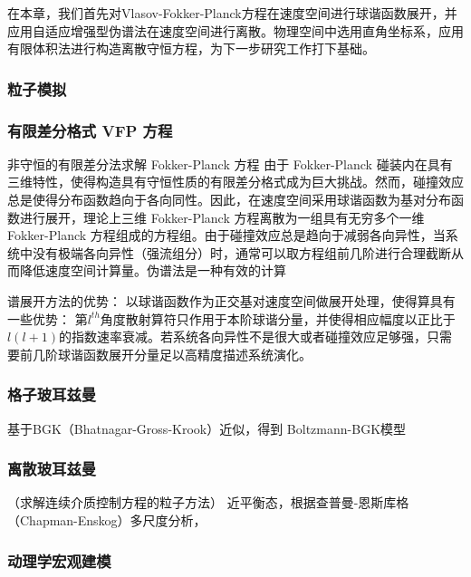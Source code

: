  

在本章，我们首先对Vlasov-Fokker-Planck方程在速度空间进行球谐函数展开，并应用自适应增强型伪谱法在速度空间进行离散。物理空间中选用直角坐标系，应用有限体积法进行构造离散守恒方程，为下一步研究工作打下基础。

\subsubsection{粒子模拟}
\label{粒子模拟}

\subsubsection{有限差分格式 VFP 方程}
\label{有限差分格式 VFP 方程}

  非守恒的有限差分法求解 Fokker-Planck 方程
  由于 Fokker-Planck 碰装内在具有三维特性，使得构造具有守恒性质的有限差分格式成为巨大挑战。然而，碰撞效应总是使得分布函数趋向于各向同性。因此，在速度空间采用球谐函数为基对分布函数进行展开，理论上三维 Fokker-Planck 方程离散为一组具有无穷多个一维 Fokker-Planck 方程组成的方程组。由于碰撞效应总是趋向于减弱各向异性，当系统中没有极端各向异性（强流组分）时，通常可以取方程组前几阶进行合理截断从而降低速度空间计算量。伪谱法是一种有效的计算
  
  谱展开方法的优势：
  以球谐函数作为正交基对速度空间做展开处理，使得算具有一些优势：
  第$l^{th}$角度散射算符只作用于本阶球谐分量，并使得相应幅度以正比于$l(l+1)$的指数速率衰减。若系统各向异性不是很大或者碰撞效应足够强，只需要前几阶球谐函数展开分量足以高精度描述系统演化。
  
\subsubsection{格子玻耳兹曼}
\label{格子玻耳兹曼}

  基于BGK（Bhatnagar-Gross-Krook）近似，得到 Boltzmann-BGK模型

\subsubsection{离散玻耳兹曼}
\label{离散玻耳兹曼}

  （求解连续介质控制方程的粒子方法）
  近平衡态，根据查普曼-恩斯库格（Chapman-Enskog）多尺度分析，
  


  
  
\subsubsection{动理学宏观建模}
\label{动理学宏观建模}

